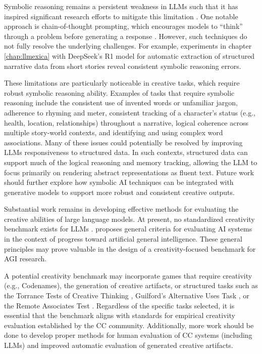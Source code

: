 \documentclass[phd,electronic,oneside,twosidetoc,letterpaper,chaptercenter,parttop,lof]{byumsphd}
\begin{document}
Symbolic reasoning remains a persistent weakness in LLMs such that it has inspired significant research efforts to mitigate this limitation \cite{Yu2023NaturalLR}. 
One notable approach is chain-of-thought prompting, which encourages models to ``think'' through a problem before generating a response \cite{wei2022cot}.  
However, such techniques do not fully resolve the underlying challenges. 
For example, experiments in chapter \ref{chap:llmexica} with DeepSeek's R1 model for automatic extraction of structured narrative data from short stories reveal consistent symbolic reasoning errors. 

These limitations are particularly noticeable in creative tasks, which require robust symbolic reasoning ability. 
Examples of tasks that require symbolic reasoning include the consistent use of invented words or unfamiliar jargon, adherence to rhyming and meter, consistent tracking of a character's status (e.g., health, location, relationships) throughout a narrative, logical coherence across multiple story-world contexts, and identifying and using complex word associations. 
Many of these issues could potentially be resolved by improving LLMs responsiveness to structured data. 
In such contexts, structured data can support much of the logical reasoning and memory tracking, allowing the LLM to focus primarily on rendering abstract representations as fluent text. 
Future work should further explore how symbolic AI techniques can be integrated with generative models to support more robust and consistent creative outputs.

Substantial work remains in developing effective methods for evaluating the creative abilities of large language models. 
At present, no standardized creativity benchmark exists for LLMs \cite{peeperkorn2024temperature}. 
\citeauthor{Morris2023PositionLO} proposes general criteria for evaluating AI systems in the context of progress toward artificial general intelligence. 
These general principles may prove valuable in the design of a creativity-focused benchmark for AGI research.

A potential creativity benchmark may incorporate games that require creativity (e.g., Codenames), the generation of creative artifacts, or structured tasks such as the Torrance Tests of Creative Thinking \cite{torrance1966tests}, Guilford's Alternative Uses Task \cite{guilford1967nature}, or the Remote Associates Test \cite{mednick1968rat}. 
Regardless of the specific tasks selected, it is essential that the benchmark aligns with standards for empirical creativity evaluation established by the CC community. 
Additionally, more work should be done to develop proper methods for human evaluation of CC systems (including LLMs) and improved automatic evaluation of generated creative artifacts.
\end{document}
